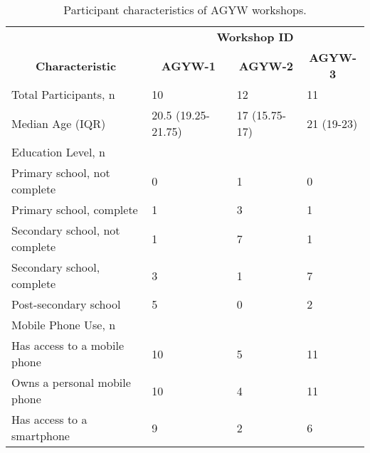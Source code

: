 \begin{table}[h!]
\caption{Participant characteristics of AGYW workshops.}
\label{tab:AGYW-participants}
\resizebox{\columnwidth}{!} {
\begin{tabular}{|p{4.4cm}||p{1.6cm}|p{1.6cm}|p{1.6cm}|}
\hline
\multicolumn{1}{|c||}{} &
\multicolumn{3}{c|}{\textbf{Workshop ID}} \\
\multicolumn{1}{|c||}{\textbf{Characteristic}} &
\multicolumn{1}{c}{\textbf{AGYW-1}} &
\multicolumn{1}{c}{\textbf{AGYW-2}} &
\multicolumn{1}{c|}{\textbf{AGYW-3}} \\
\hline
Total Participants, n & 10 & 12 & 11 \\
\hline
Median Age (IQR) & 20.5 (19.25-21.75) & 17 (15.75-17) & 21 (19-23) \\
\hline
Education Level, n &  &  & \\ 
\hspace{3mm}Primary school, not complete & 0 & 1 & 0 \\ 
\hspace{3mm}Primary school, complete & 1 & 3 & 1 \\
\hspace{3mm}Secondary school, not complete & 1 & 7 & 1\\
\hspace{3mm}Secondary school, complete & 3 & 1 & 7\\
\hspace{3mm}Post-secondary school & 5 & 0 & 2 \\ 
\hline
Mobile Phone Use, n &  &  & \\ 
\hspace{3mm}Has access to a mobile phone & 10 & 5 & 11 \\ 
\hspace{3mm}Owns a personal mobile phone & 10 & 4 & 11 \\
\hspace{3mm}Has access to a smartphone & 9 & 2 & 6 \\
\hline
\end{tabular}
}
\end{table}

